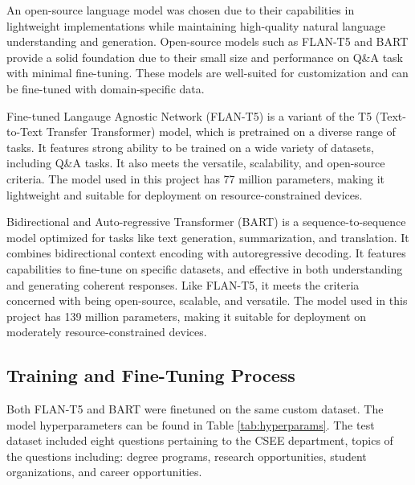 \documentclass[conference]{IEEEtran}
\begin{document}
An open-source language model was chosen due to their capabilities in lightweight implementations while maintaining high-quality natural language understanding and generation.
Open-source models such as FLAN-T5 \cite{b8} and BART \cite{b9} provide a solid foundation due to their small size and performance on Q\&A task with minimal fine-tuning. 
These models are well-suited for customization and can be fine-tuned with domain-specific data.

Fine-tuned Langauge Agnostic Network (FLAN-T5) is a variant of the T5 (Text-to-Text Transfer Transformer) model, which is pretrained on a diverse range of tasks. 
It features strong ability to be trained on a wide variety of datasets, including Q\&A tasks. 
It also meets the versatile, scalability, and open-source criteria. 
The model used in this project has 77 million parameters, making it lightweight and suitable for deployment on resource-constrained devices.

Bidirectional and Auto-regressive Transformer (BART) is a sequence-to-sequence model optimized for tasks like text generation, summarization, and translation. 
It combines bidirectional context encoding with autoregressive decoding. 
It features capabilities to fine-tune on specific datasets, and effective in both understanding and generating coherent responses.
Like FLAN-T5, it meets the criteria concerned with being open-source, scalable, and versatile. 
The model used in this project has 139 million parameters, making it suitable for deployment on moderately resource-constrained devices.

\subsection{Training and Fine-Tuning Process} 
Both FLAN-T5 and BART were finetuned on the same custom dataset. The model hyperparameters can be found in Table \ref{tab:hyperparams}.
The test dataset included eight questions pertaining to the CSEE department, topics of the questions including: degree programs, research opportunities, student organizations, and career opportunities. 
\end{document}
